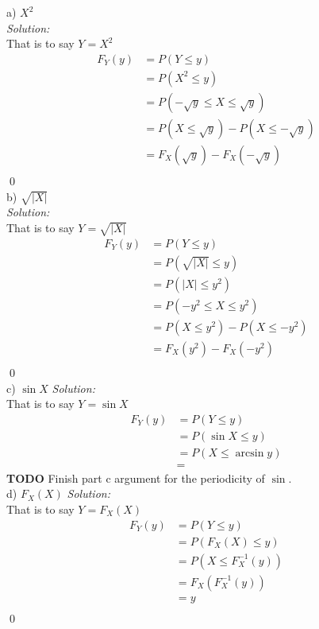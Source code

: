 \documentclass[10pt]{amsart}
\begin{document}
\noindent a) $X^2$ \\
\textit{Solution:} \\
That is to say $Y = X^2$
\begin{align*}
F_Y(y) &= P(Y \leq y) \\
	   &= P(X^2 \leq y) \\
	   &= P(-\sqrt{y} \leq X \leq \sqrt{y}) \\
	   &= P(X \leq \sqrt{y})  - P(X \leq -\sqrt{y}) \\
	   &= F_X(\sqrt{y})  - F_X(-\sqrt{y}) \\
\end{align*}
\qed
\\
\noindent b) $\sqrt{|X|}$ \\
\textit{Solution:} \\
That is to say $Y = \sqrt{|X|}$
\begin{align*}
F_Y(y) &= P(Y \leq y) \\
	   &= P(\sqrt{|X|} \leq y) \\
	   &= P(|X| \leq y^2) \\
	   &= P(-y^2 \leq X \leq y^2) \\
	   &= P(X \leq y^2)  - P(X \leq -y^2) \\
	   &= F_X(y^2)  - F_X(-y^2) \\
\end{align*}
\qed
\\
\noindent c) $\sin X$ \textit{Solution:} \\
That is to say $Y = \sin X$
\begin{align*}
F_Y(y) &= P(Y \leq y) \\
	   &= P(\sin X \leq y) \\
	   &= P( X \leq \arcsin y ) \\
	   &= 
\end{align*}
\textbf{TODO} Finish part c argument for the periodicity of $\sin$.
\\
\noindent d) $F_X(X)$ \textit{Solution:} \\
That is to say $Y = F_X(X)$
\begin{align*}
F_Y(y) &= P(Y \leq y) \\
	   &= P(F_X(X) \leq y) \\
	   &= P(X \leq F_X^{-1}(y)) \\
	   &= F_X(F_X^{-1}(y)) \\
	   &= y \\
\end{align*}
\qed
\\
\\
\end{document}
